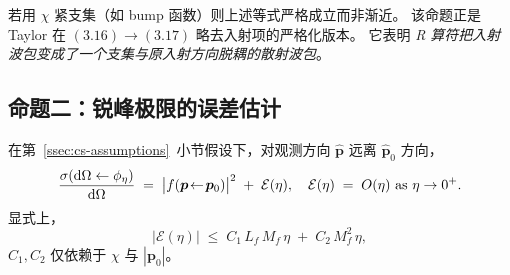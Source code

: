 \begin{remark}
若用 $\chi$ 紧支集（如 bump 函数）则上述等式严格成立而非渐近。
该命题正是 Taylor 在 $(3.16)\to(3.17)$ 略去入射项的严格化版本。
它表明 \emph{R 算符把入射波包变成了一个支集与原入射方向脱耦的散射波包}。
\end{remark}

\subsection{命题二：锐峰极限的误差估计}\label{ssec:cs-sharp-limit}

\begin{theorem}\label{thm:cs-sharp}
在第~\ref{ssec:cs-assumptions}~小节假设下，对观测方向 $\hat{\bm{p}}$ 远离 $\hat{\bm{p}}_0$ 方向，
\begin{equation}
\frac{\sigma(\mathrm{d}\Omega \leftarrow \phi_\eta)}{\mathrm{d}\Omega}
\;=\; \big|f(\bm{p}\!\leftarrow\!\bm{p}_0)\big|^2 \;+\; \mathcal{E}(\eta),
\quad \mathcal{E}(\eta) \;=\; O(\eta) \text{ as } \eta\to 0^+.
\label{eq:cs-sharp-error}
\end{equation}
显式上，
\begin{equation}
|\mathcal{E}(\eta)| \;\leq\; C_1\,L_f\,M_f\,\eta \;+\; C_2\,M_f^2\,\eta,
\label{eq:cs-error-bound}
\end{equation}
$C_1, C_2$ 仅依赖于 $\chi$ 与 $|\bm{p}_0|$。
\end{theorem}

